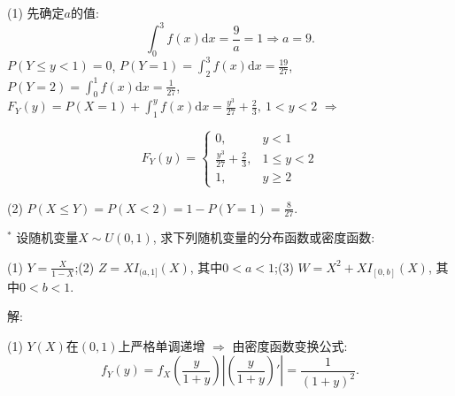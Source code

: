\documentclass[standard]{ExBook}
\begin{document}
\begin{qitems}
\begin{bbox}
(1) 先确定$a$的值:
$$\displaystyle\int_{0}^{3}f(x)\mathrm{d}x=\frac{9}{a}=1 \Longrightarrow a=9.$$
$P(Y\leq y<1)=0$, $P(Y=1)=\displaystyle\int_{2}^{3}f(x)\mathrm{d}x=\frac{19}{27}$, $P(Y=2)=\displaystyle\int_{0}^{1}f(x)\mathrm{d}x=\frac{1}{27}$, $F_{Y}(y)=P(X=1)+\displaystyle\int_{1}^{y}f(x)\mathrm{d}x=\frac{y^3}{27}+\frac{2}{3},\ 1<y<2$ $\Longrightarrow$
\vspace{-2em}
\begin{center}
\begin{equation}
    F_{Y}(y)=
    \left\{
    \begin{array}{cl}
        \nonumber
        0, &y<1\\
        \frac{y^3}{27}+\frac{2}{3}, &1\leq y<2\\
        1, &y\geq 2
    \end{array}
    \right.
\end{equation}
\end{center}
(2) $P(X\leq Y)=P(X<2)=1-P(Y=1)=\displaystyle\frac{8}{27}$.
    \end{bbox}

\vspace{-5em}

    \begin{bbox}
    \begin{shaded}
        \qitem$^{*}$
设随机变量$X\sim U(0,1)$, 求下列随机变量的分布函数或密度函数:

(1) $Y=\frac{X}{1-X}$;\qquad(2) $Z=XI_{(a,1]}(X)$, 其中$0 < a < 1$;\qquad(3) $W=X^2+XI_{[0,b]}(X)$, 其中$0 < b < 1$.
    \end{shaded}
    \end{bbox}

\vspace{-5em}

    \begin{bbox}
解: 

(1) $Y(X)$在$(0,1)$上严格单调递增 $\Longrightarrow$ 由密度函数变换公式:
$$f_{Y}(y)=f_{X}(\displaystyle\frac{y}{1+y})\left|\left(\displaystyle\frac{y}{1+y}\right)'\right|=\displaystyle\frac{1}{(1+y)^2}.$$
    \end{bbox}

\vspace{-5em}


\end{qitems}
\end{document}
